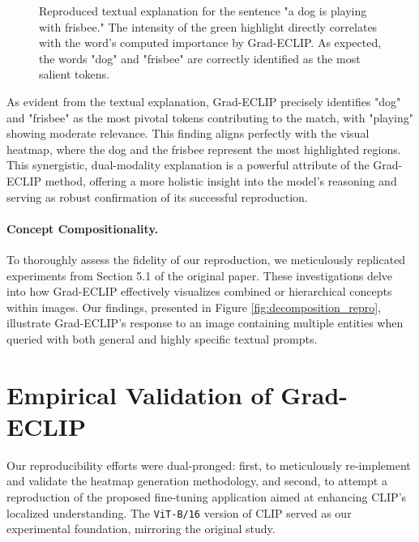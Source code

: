 \documentclass[10pt]{article} %
\begin{document}
\begin{figure}[h!]
\centering
\fbox{\rule{0pt}{1.5cm}\rule{0.8\linewidth}{0pt}}
\caption{Reproduced textual explanation for the sentence "a dog is playing with frisbee." The intensity of the green highlight directly correlates with the word's computed importance by Grad-ECLIP. As expected, the words "dog" and "frisbee" are correctly identified as the most salient tokens.}
\label{fig:textual_repro}
\end{figure}

As evident from the textual explanation, Grad-ECLIP precisely identifies "dog" and "frisbee" as the most pivotal tokens contributing to the match, with "playing" showing moderate relevance. This finding aligns perfectly with the visual heatmap, where the dog and the frisbee represent the most highlighted regions. This synergistic, dual-modality explanation is a powerful attribute of the Grad-ECLIP method, offering a more holistic insight into the model's reasoning and serving as robust confirmation of its successful reproduction.

\paragraph{Concept Compositionality.}
To thoroughly assess the fidelity of our reproduction, we meticulously replicated experiments from Section 5.1 of the original paper. These investigations delve into how Grad-ECLIP effectively visualizes combined or hierarchical concepts within images. Our findings, presented in Figure \ref{fig:decomposition_repro}, illustrate Grad-ECLIP's response to an image containing multiple entities when queried with both general and highly specific textual prompts.

\section{Empirical Validation of Grad-ECLIP}
\label{repro_efforts} %

Our reproducibility efforts were dual-pronged: first, to meticulously re-implement and validate the heatmap generation methodology, and second, to attempt a reproduction of the proposed fine-tuning application aimed at enhancing CLIP's localized understanding. The \texttt{ViT-B/16} version of CLIP served as our experimental foundation, mirroring the original study.
\end{document}

